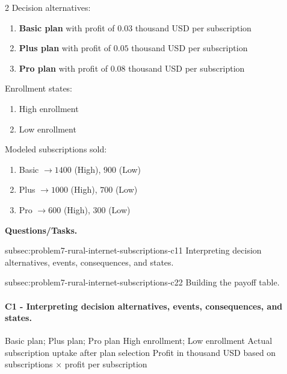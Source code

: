 	\begin{multicols}{2}
		Decision alternatives:
		\begin{enumerate}[label=\arabic*.]
			\item \textbf{Basic plan} with profit of $0.03$ thousand USD per subscription
			\item \textbf{Plus plan} with profit of $0.05$ thousand USD per subscription
			\item \textbf{Pro plan} with profit of $0.08$ thousand USD per subscription
		\end{enumerate}

		Enrollment states:
		\begin{enumerate}[label=\arabic*.]
			\item High enrollment
			\item Low enrollment
		\end{enumerate}

			\columnbreak

		Modeled subscriptions sold:
		\begin{enumerate}[label=\arabic*.]
			\item Basic $\to 1400$ (High), $900$ (Low)
			\item Plus $\to 1000$ (High), $700$ (Low)
			\item Pro $\to 600$ (High), $300$ (Low)
		\end{enumerate}
	\end{multicols}

	\textbf{Questions/Tasks.}
	\begin{enumerate}
		\CriterionTask
		{subsec:problem7-rural-internet-subscriptions-c1}{1}
		{Interpreting decision alternatives, events, consequences, and states.}

		\CriterionTask
		{subsec:problem7-rural-internet-subscriptions-c2}{2}
		{Building the payoff table.}
	\end{enumerate}

	\paragraph*{C1 - Interpreting decision alternatives, events, consequences, and states.}
	\label{subsec:problem7-rural-internet-subscriptions-c1}
	\DecisionElementsTable
	{Basic plan; Plus plan; Pro plan}
	{High enrollment; Low enrollment}
	{Actual subscription uptake after plan selection}
	{Profit in thousand USD based on subscriptions $\times$ profit per subscription}


